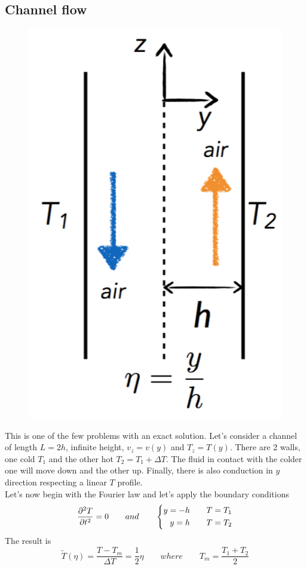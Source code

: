 	\subsection{Channel flow}
		\begin{figure}
		\vspace{-5 mm}
		\includegraphics[scale=0.3]{ch5/12}
		\end{figure}			
		This is one of the few problems with an exact solution. Let's consider a channel of length $L=2h$, infinite height, $v_z = v(y)$ and $T_z = T(y)$. There are 2 walls, one cold $T_1$ and the other hot $T_2 = T_1 + \Delta T$. The fluid in contact with the colder one will move down and the other up. Finally, there is also conduction in $y$ direction respecting a linear $T$ profile. \\
		Let's now begin with the Fourier law and let's apply the boundary conditions
		\begin{equation}
			\frac{\D ^2 T}{\D t^2} = 0  \qquad and \qquad 
			\left\{ 
			\begin{aligned}
				y =- h \qquad T &= T_1 \\
				y = h \qquad T &= T_2
			\end{aligned}
			\right.
		\end{equation}
		The result is 
		\begin{equation}
			\tilde{T} (\eta ) = \frac{T-T_m}{\Delta T} = \frac{1}{2} \eta \qquad where \qquad T_m = \frac{T_1 + T_2}{2}
		\end{equation}
		
